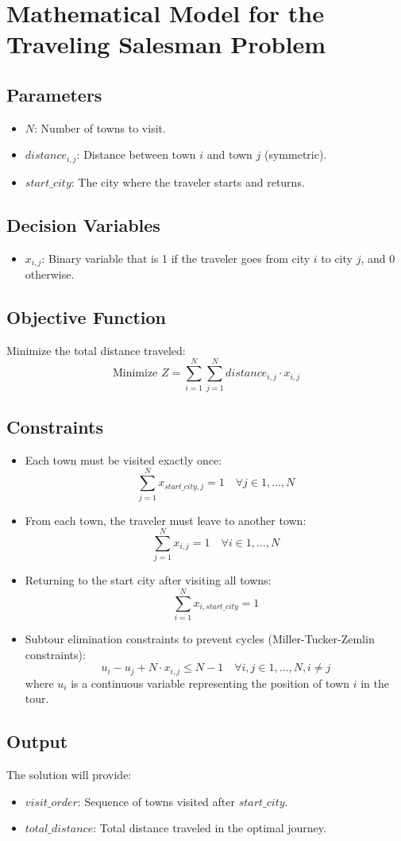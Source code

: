 \documentclass{article}
\begin{document}
\section*{Mathematical Model for the Traveling Salesman Problem}

\subsection*{Parameters}
\begin{itemize}
    \item $N$: Number of towns to visit.
    \item $distance_{i,j}$: Distance between town $i$ and town $j$ (symmetric).
    \item $start\_city$: The city where the traveler starts and returns.
\end{itemize}

\subsection*{Decision Variables}
\begin{itemize}
    \item $x_{i,j}$: Binary variable that is 1 if the traveler goes from city $i$ to city $j$, and 0 otherwise.
\end{itemize}

\subsection*{Objective Function}
Minimize the total distance traveled:
\[
\text{Minimize } Z = \sum_{i=1}^{N} \sum_{j=1}^{N} distance_{i,j} \cdot x_{i,j}
\]

\subsection*{Constraints}
\begin{itemize}
    \item Each town must be visited exactly once:
    \[
    \sum_{j=1}^{N} x_{start\_city,j} = 1 \quad \forall j \in {1, \ldots, N}
    \]
    
    \item From each town, the traveler must leave to another town:
    \[
    \sum_{j=1}^{N} x_{i,j} = 1 \quad \forall i \in {1, \ldots, N}
    \]

    \item Returning to the start city after visiting all towns:
    \[
    \sum_{i=1}^{N} x_{i,start\_city} = 1
    \]

    \item Subtour elimination constraints to prevent cycles (Miller-Tucker-Zemlin constraints):
    \[
    u_i - u_j + N \cdot x_{i,j} \leq N - 1 \quad \forall i,j \in {1, \ldots, N}, i \neq j
    \]
    where $u_i$ is a continuous variable representing the position of town $i$ in the tour.
\end{itemize}

\subsection*{Output}
The solution will provide:
\begin{itemize}
    \item $visit\_order$: Sequence of towns visited after $start\_city$.
    \item $total\_distance$: Total distance traveled in the optimal journey.
\end{itemize}
\end{document}
